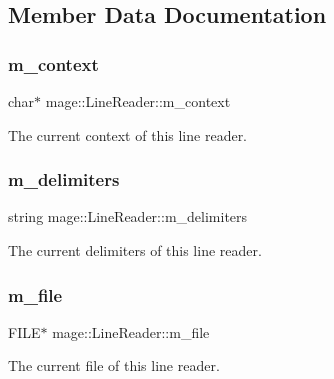 \subsection{Member Data Documentation}
\hypertarget{classmage_1_1_line_reader_a2f1cfe313dc89741386178e63a6b8b0c}{}\label{classmage_1_1_line_reader_a2f1cfe313dc89741386178e63a6b8b0c} 
\subsubsection{\texorpdfstring{m\+\_\+context}{m\_context}}
{\footnotesize\ttfamily char$\ast$ mage\+::\+Line\+Reader\+::m\+\_\+context\hspace{0.3cm}{\ttfamily [protected]}}

The current context of this line reader. \hypertarget{classmage_1_1_line_reader_a6de3398ac59fdd98f8c40cff6f5c1075}{}\label{classmage_1_1_line_reader_a6de3398ac59fdd98f8c40cff6f5c1075} 
\subsubsection{\texorpdfstring{m\+\_\+delimiters}{m\_delimiters}}
{\footnotesize\ttfamily string mage\+::\+Line\+Reader\+::m\+\_\+delimiters\hspace{0.3cm}{\ttfamily [private]}}

The current delimiters of this line reader. \hypertarget{classmage_1_1_line_reader_a0bc5f3543a85487fc0e52a6015048476}{}\label{classmage_1_1_line_reader_a0bc5f3543a85487fc0e52a6015048476} 
\subsubsection{\texorpdfstring{m\+\_\+file}{m\_file}}
{\footnotesize\ttfamily F\+I\+LE$\ast$ mage\+::\+Line\+Reader\+::m\+\_\+file\hspace{0.3cm}{\ttfamily [private]}}

The current file of this line reader. \hypertarget{classmage_1_1_line_reader_ad6f55ba12fc610ab2fc1c26a48d12321}{}\label{classmage_1_1_line_reader_ad6f55ba12fc610ab2fc1c26a48d12321} 
